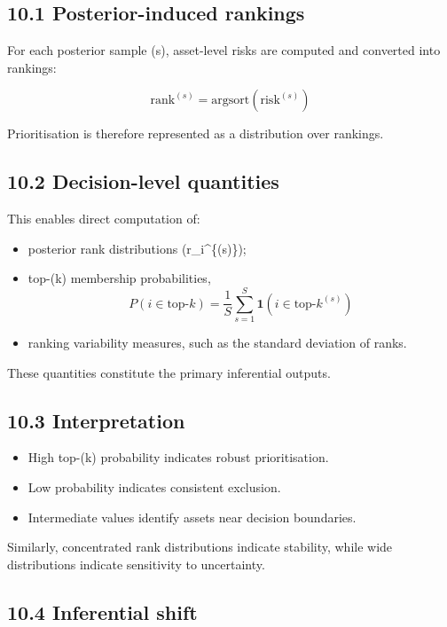 \documentclass[
]{article}
\providecommand{\tightlist}{%
  \setlength{\itemsep}{0pt}\setlength{\parskip}{0pt}}
\begin{document}
\subsection{10.1 Posterior-induced
rankings}\label{posterior-induced-rankings}

For each posterior sample (s), asset-level risks are computed and
converted into rankings:

\[
\text{rank}^{(s)} = \text{argsort}(\text{risk}^{(s)})
\]

Prioritisation is therefore represented as a distribution over rankings.

\subsection{10.2 Decision-level
quantities}\label{decision-level-quantities}

This enables direct computation of:

\begin{itemize}
\tightlist
\item
  posterior rank distributions (r\_i\^{}\{(s)\});
\item
  top-(k) membership probabilities, \[
  P(i \in \text{top-}k) = \frac{1}{S} \sum_{s=1}^{S} \mathbf{1}(i \in \text{top-}k^{(s)})
  \]
\item
  ranking variability measures, such as the standard deviation of ranks.
\end{itemize}

These quantities constitute the primary inferential outputs.

\subsection{10.3 Interpretation}\label{interpretation-1}

\begin{itemize}
\tightlist
\item
  High top-(k) probability indicates robust prioritisation.
\item
  Low probability indicates consistent exclusion.
\item
  Intermediate values identify assets near decision boundaries.
\end{itemize}

Similarly, concentrated rank distributions indicate stability, while
wide distributions indicate sensitivity to uncertainty.

\subsection{10.4 Inferential shift}\label{inferential-shift}
\end{document}
